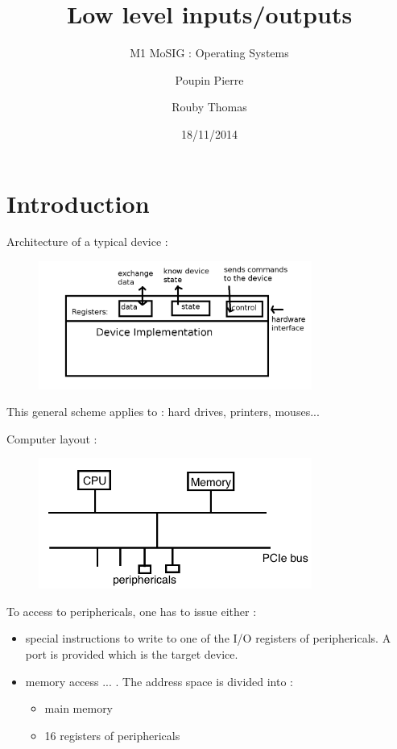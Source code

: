 \documentclass[a4paper,10pt]{article}
\title{\textbf{Low level inputs/outputs}}
\subtitle{M1 MoSIG : Operating Systems}
\author{Poupin Pierre \and Rouby Thomas}
\date{18/11/2014}
\begin{document}
\maketitle

\section{Introduction}

Architecture of a typical device :

\begin{figure}[h!]
  \begin{center}
    \includegraphics[width=0.8\textwidth]{architecture_device.png}
    \label{Architecture of a typical device}
  \end{center}
\end{figure}
This general scheme applies to : hard drives, printers, mouses...


Computer layout :
\begin{figure}[h!]
  \begin{center}
    \includegraphics[width=0.8\textwidth]{computer_layout.png}
    \label{fig:}
  \end{center}
\end{figure}

To access to periphericals, one has to issue either :

\begin{itemize}
  \item special instructions to write to one of the I/O registers of periphericals.
  A port is provided which is the target device.
  
  \item memory access ... . The address space is divided into :
  \begin{itemize}
    \item  main memory
    \item 16 registers of periphericals
  \end{itemize}
\end{itemize}
\end{document}
